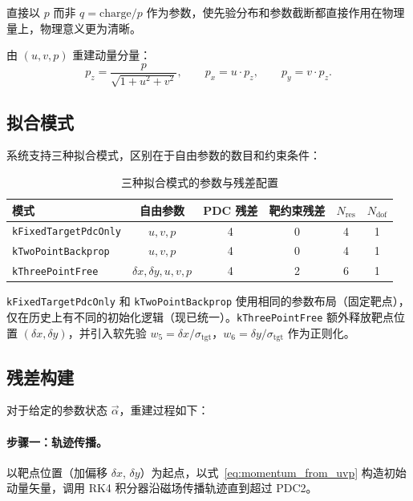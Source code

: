 \documentclass[a4paper, 11pt]{article}
\begin{document}
直接以 $p$ 而非 $q = \mathrm{charge}/p$ 作为参数，使先验分布和参数截断都直接作用在物理量上，物理意义更为清晰。

由 $(u, v, p)$ 重建动量分量：
\begin{equation}
  p_z = \frac{p}{\sqrt{1 + u^2 + v^2}}, \qquad
  p_x = u \cdot p_z, \qquad
  p_y = v \cdot p_z.
  \label{eq:momentum_from_uvp}
\end{equation}

\subsection{拟合模式}

系统支持三种拟合模式，区别在于自由参数的数目和约束条件：

\begin{table}[H]
\centering
\caption{三种拟合模式的参数与残差配置}
\label{tab:fit_modes}
\begin{tabular}{lccccc}
\toprule
模式 & 自由参数 & PDC 残差 & 靶约束残差 & $N_\mathrm{res}$ & $N_\mathrm{dof}$ \\
\midrule
\texttt{kFixedTargetPdcOnly} & $u, v, p$ & 4 & 0 & 4 & 1 \\
\texttt{kTwoPointBackprop} & $u, v, p$ & 4 & 0 & 4 & 1 \\
\texttt{kThreePointFree} & $\delta x, \delta y, u, v, p$ & 4 & 2 & 6 & 1 \\
\bottomrule
\end{tabular}
\end{table}

\texttt{kFixedTargetPdcOnly} 和 \texttt{kTwoPointBackprop} 使用相同的参数布局（固定靶点），仅在历史上有不同的初始化逻辑（现已统一）。\texttt{kThreePointFree} 额外释放靶点位置 $(\delta x, \delta y)$，并引入软先验 $w_5 = \delta x / \sigma_\mathrm{tgt}$，$w_6 = \delta y / \sigma_\mathrm{tgt}$ 作为正则化。

\subsection{残差构建}
\label{sec:residual}

对于给定的参数状态 $\vec{\alpha}$，重建过程如下：

\paragraph{步骤一：轨迹传播。}
以靶点位置（加偏移 $\delta x$, $\delta y$）为起点，以式~\eqref{eq:momentum_from_uvp} 构造初始动量矢量，调用 RK4 积分器沿磁场传播轨迹直到超过 PDC2。
\end{document}
